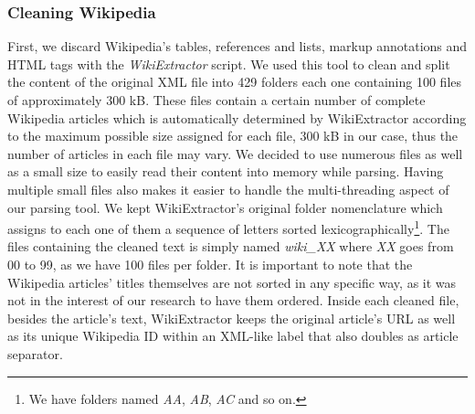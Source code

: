\subsubsection{Cleaning Wikipedia} First, we discard Wikipedia's  tables, references and lists, markup annotations and HTML tags with the \textit{WikiExtractor} \cite{Attardi2015}  script. 
We used this tool to clean and split the content of the original XML file into 429 folders each one containing 100 files of approximately 300 kB. These files contain a certain number of complete Wikipedia articles which is automatically determined by WikiExtractor  according to the maximum possible size assigned for each file, 300 kB in our case, thus the number of articles in each file may vary. We decided to use numerous files as well as a small size to easily read their content into memory while parsing. Having multiple small files also makes it easier to handle the multi-threading aspect of our parsing tool.
We kept WikiExtractor's original folder nomenclature which assigns to each one of them a sequence of letters sorted lexicographically\footnote{We have folders named \textit{AA}, \textit{AB}, \textit{AC} and so on.}. The files containing the cleaned text is simply named \textit{wiki\_XX} where  \textit{XX} goes from 00 to 99, as we have 100 files per folder. 
It is important to note that the Wikipedia articles' titles themselves are not sorted in any specific way, as it was not in the interest of our research to have them ordered. 
Inside each cleaned file, besides the article's text, WikiExtractor keeps the original article's URL as well as its unique Wikipedia ID within an XML-like label that also doubles as  article separator. 

